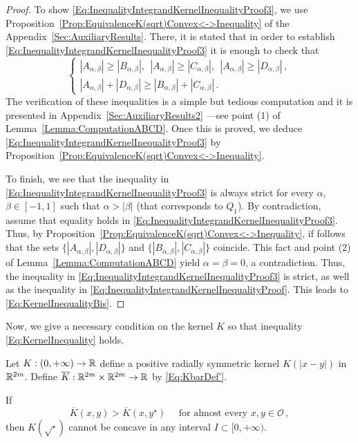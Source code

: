 \begin{proof}
To show \eqref{Eq:InequalityIntegrandKernelInequalityProof3}, we use Proposition~\ref{Prop:EquivalenceK(sqrt)Convex<->Inequality} of the Appendix~\ref{Sec:AuxiliaryResults}. There, it is stated that in order to establish \eqref{Eq:InequalityIntegrandKernelInequalityProof3} it is enough to check that
$$
\begin{cases}
|A_{\alpha,\beta}| \geq |B_{\alpha,\beta}|,\ \ |A_{\alpha,\beta}| \geq |C_{\alpha,\beta}|, \ \ |A_{\alpha,\beta}| \geq |D_{\alpha,\beta}|\,, \\
|A_{\alpha,\beta}| + |D_{\alpha,\beta}| \geq |B_{\alpha,\beta}| + |C_{\alpha,\beta}|\,.
\end{cases}
$$
The verification of these inequalities is a simple but tedious computation and it is presented in Appendix~\ref{Sec:AuxiliaryResults2} ---see point (1) of Lemma~\ref{Lemma:ComputationABCD}. Once this is proved, we deduce \eqref{Eq:InequalityIntegrandKernelInequalityProof3} by Proposition~\ref{Prop:EquivalenceK(sqrt)Convex<->Inequality}.

To finish, we see that the inequality in \eqref{Eq:InequalityIntegrandKernelInequalityProof3} is always strict for every $\alpha$, $\beta \in [-1,1]$ such that $\alpha > |\beta|$ (that corresponds to $Q_1$). By contradiction, assume that equality holds in \eqref{Eq:InequalityIntegrandKernelInequalityProof3}. Thus, by Proposition~\ref{Prop:EquivalenceK(sqrt)Convex<->Inequality}, if follows that the sets $\{|A_{\alpha,\beta}|, |D_{\alpha,\beta}|\} $ and $\{|B_{\alpha,\beta}|,|C_{\alpha,\beta}|\}$ coincide. This fact and point (2) of Lemma~\ref{Lemma:ComputationABCD} yield $\alpha = \beta = 0$, a contradiction. Thus, the inequality in \eqref{Eq:InequalityIntegrandKernelInequalityProof3} is strict, as well as the inequality in \eqref{Eq:InequalityIntegrandKernelInequalityProof}. This leads to \eqref{Eq:KernelInequalityBis}.
\end{proof}


Now, we give a necessary condition on the kernel $K$ so that inequality \eqref{Eq:KernelInequality} holds.

\begin{proposition}
\label{Prop:KernelInequalityNecessaryCondition} Let $K:(0,+\infty) \to \mathbb{R}$ define a positive radially symmetric kernel $K(|x-y|)$ in $\mathbb{R}^{2m}$. Define $\overline{K} : \mathbb{R}^{2m}\times \mathbb{R}^{2m} \to \mathbb{R}$ by \eqref{Eq:KbarDef'}. 

If
\begin{equation}
\label{Eq:KernelInequalityAE}
\overline{K}(x,y) > \overline{K}(x, y^\star) \quad \text{ for almost every }x,y \in \mathcal{O}\,,
\end{equation}
then $K(\sqrt{\cdot})$ cannot be concave in any interval $I\subset [0,+\infty)$.
\end{proposition}

